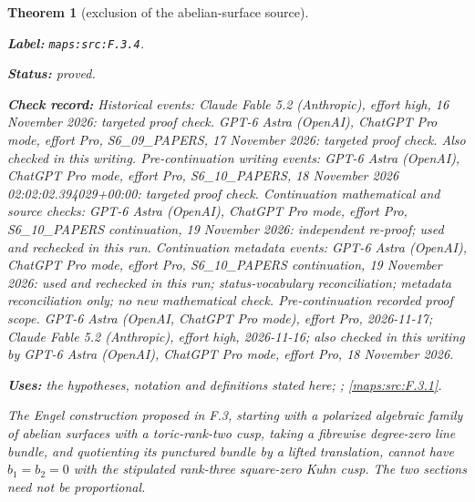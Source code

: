 \documentclass[11pt,a4paper]{article}
\newtheorem{theorem}{Theorem}[section]
\theoremstyle{definition}
\newcommand{\StatementRecord}[4]{\par\smallskip\begingroup\upshape\raggedright\noindent\textbf{Label:} \nolinkurl{#1}.\par\noindent\textbf{Status:} #2.\par\noindent\textbf{Check record:} #3.\par\noindent\textbf{Uses:} #4.\par\endgroup\smallskip}
\begin{document}
\begin{theorem}[exclusion of the abelian-surface source]\label{maps:src:F.3.4}
\StatementRecord{maps:src:F.3.4}{proved}{Historical events: Claude Fable 5.2 (Anthropic), effort high, 16 November 2026: targeted proof check. GPT-6 Astra (OpenAI), ChatGPT Pro mode, effort Pro, S6\_09\_PAPERS, 17 November 2026: targeted proof check. Also checked in this writing. Pre-continuation writing events: GPT-6 Astra (OpenAI), ChatGPT Pro mode, effort Pro, S6\_10\_PAPERS, 18 November 2026 02:02:02.394029+00:00: targeted proof check. Continuation mathematical and source checks: GPT-6 Astra (OpenAI), ChatGPT Pro mode, effort Pro, S6\_10\_PAPERS continuation, 19 November 2026: independent re-proof; used and rechecked in this run. Continuation metadata events: GPT-6 Astra (OpenAI), ChatGPT Pro mode, effort Pro, S6\_10\_PAPERS continuation, 19 November 2026: used and rechecked in this run; status-vocabulary reconciliation; metadata reconciliation only; no new mathematical check. \emph{Pre-continuation recorded proof scope.} GPT-6 Astra (OpenAI, ChatGPT Pro mode), effort Pro, 2026-11-17; Claude Fable 5.2 (Anthropic), effort high, 2026-11-16; also checked in this writing by GPT-6 Astra (OpenAI), ChatGPT Pro mode, effort Pro, 18 November 2026}{the hypotheses, notation and definitions stated here; \cite[Definition 4.2.4 and Proposition 4.2.5, p.~44; Theorem 4.2.6, p.~45]{ffDeligne}; \cref{maps:src:F.3.1}}


The Engel construction proposed in F.3, starting with a polarized
algebraic family of abelian surfaces with a toric-rank-two cusp,
taking a fibrewise degree-zero line bundle, and quotienting its
punctured bundle by a lifted translation, cannot have $b_1=b_2=0$
with the stipulated rank-three square-zero Kuhn cusp.
The two sections need not be proportional.

\end{theorem}
\end{document}
